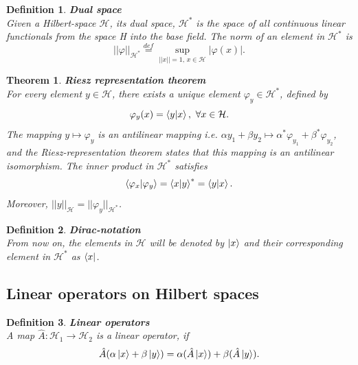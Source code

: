 \documentclass[12pt, a4paper,  nobibnotes]{article}
\newtheorem{theorem}{Theorem}
\newtheorem{definition}{Definition}
\begin{document}
\begin{definition}
    \textbf{Dual space}\\
    Given a Hilbert-space $\mathcal H$, its dual space, $\mathcal H^*$ is the space of all continuous linear
    functionals from the space H into the base field.
    The norm of an element in $\mathcal H^*$ is 
    \begin{equation*}
        ||\varphi||_{\mathcal H^*} \overset{def}{=} \underset{||x||=1,\, x \in \mathcal H}{\sup} |\varphi(x)|.
    \end{equation*}
\end{definition}

\begin{theorem}
    \textbf{Riesz representation theorem}\\
    For every element $y \in \mathcal H$, there exists a unique element $\varphi_{y} \in \mathcal H^*$, defined by
    \begin{equation*}
        \varphi_{y}(x) = \braket{y| x},~\forall x \in \mathcal H.
    \end{equation*}
    The mapping $y \mapsto \varphi_{y}$ is an antilinear mapping i.e. $\alpha y_1 + \beta y_2 
    \mapsto \alpha^* \varphi_{y_1} + \beta^* \varphi_{y_2}$, and the Riesz-representation theorem states 
    that this mapping is an antilinear isomorphism. The inner product in $\mathcal H^*$ satisfies 
    \begin{equation*}
        \braket{\varphi_{x}|\varphi_{y}} = \braket{x|y}^* = \braket{y | x}.
    \end{equation*}
    Moreover, $||y||_{\mathcal H} = ||\varphi_{y}||_{\mathcal H^*}$.
\end{theorem}

\begin{definition}
    \textbf{Dirac-notation}\\
    From now on, the elements in $\mathcal H$ will be denoted by $\ket x$ and their corresponding
    element in $\mathcal H^*$ as $\bra x$.
\end{definition}

\subsection{Linear operators on Hilbert spaces}
\label{appendix:linear-ops}
\begin{definition}
    \textbf{Linear operators}\\
    A map $\hat A: \mathcal H_1 \rightarrow \mathcal H_2$ is a linear operator, if 
    \begin{equation*}
        \hat A (\alpha\ket x + \beta\ket y) = \alpha (\hat A \ket x) + \beta (\hat A \ket y).
    \end{equation*}
\end{definition}
\end{document}
